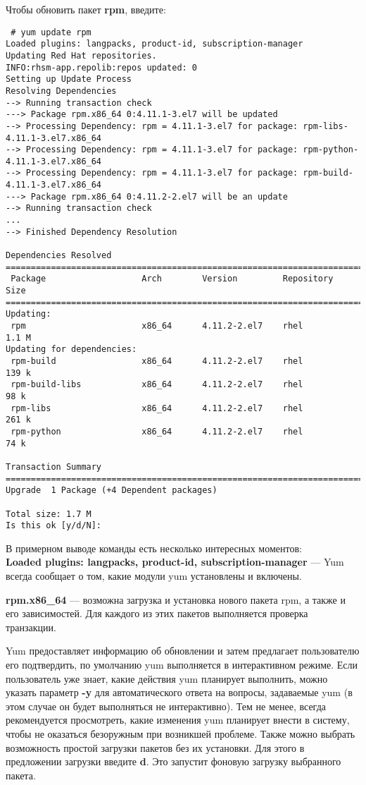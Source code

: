 \documentclass[a4paper,10pt,twoside]{article}
\begin{document}
Чтобы обновить пакет \textbf{rpm}, введите:
\begin{verbatim}
 # yum update rpm
Loaded plugins: langpacks, product-id, subscription-manager
Updating Red Hat repositories.
INFO:rhsm-app.repolib:repos updated: 0
Setting up Update Process
Resolving Dependencies
--> Running transaction check
---> Package rpm.x86_64 0:4.11.1-3.el7 will be updated
--> Processing Dependency: rpm = 4.11.1-3.el7 for package: rpm-libs-4.11.1-3.el7.x86_64
--> Processing Dependency: rpm = 4.11.1-3.el7 for package: rpm-python-4.11.1-3.el7.x86_64
--> Processing Dependency: rpm = 4.11.1-3.el7 for package: rpm-build-4.11.1-3.el7.x86_64
---> Package rpm.x86_64 0:4.11.2-2.el7 will be an update
--> Running transaction check
...
--> Finished Dependency Resolution

Dependencies Resolved
=============================================================================
 Package                   Arch        Version         Repository       Size
=============================================================================
Updating:
 rpm                       x86_64      4.11.2-2.el7    rhel            1.1 M
Updating for dependencies:
 rpm-build                 x86_64      4.11.2-2.el7    rhel            139 k
 rpm-build-libs            x86_64      4.11.2-2.el7    rhel             98 k
 rpm-libs                  x86_64      4.11.2-2.el7    rhel            261 k
 rpm-python                x86_64      4.11.2-2.el7    rhel             74 k

Transaction Summary
=============================================================================
Upgrade  1 Package (+4 Dependent packages)

Total size: 1.7 M
Is this ok [y/d/N]:
\end{verbatim} 


В примерном выводе команды есть несколько интересных моментов:\\
\textbf{Loaded plugins: langpacks, product-id, subscription-manager} — Yum всегда сообщает о том, какие модули yum установлены и включены.

\textbf{rpm.x86\_64} — возможна загрузка и установка нового пакета rpm, а также и его зависимостей. Для каждого из этих пакетов выполняется проверка транзакции.

Yum предоставляет информацию об обновлении и затем предлагает пользователю его подтвердить, по умолчанию yum выполняется в интерактивном режиме. Если пользователь уже знает, какие действия yum планирует выполнить, можно указать параметр \textbf{-y} для автоматического ответа на вопросы, задаваемые yum (в этом случае он будет выполняться не интерактивно). Тем не менее, всегда рекомендуется просмотреть, какие изменения yum планирует внести в систему, чтобы не оказаться безоружным при возникшей проблеме. Также можно выбрать возможность простой загрузки пакетов без их установки. Для этого в предложении загрузки введите \textbf{d}. Это запустит фоновую загрузку выбранного пакета.
\end{document}
